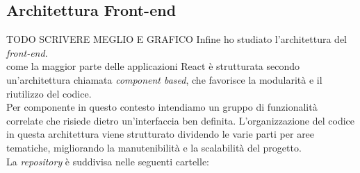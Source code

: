 \subsection{Architettura Front-end}
                                          TODO SCRIVERE MEGLIO E GRAFICO
Infine ho studiato l'architettura del \textit{front-end}.\\
{\movi} come la maggior parte delle applicazioni React è strutturata secondo un'architettura chiamata \textit{component 
based}, che favorisce la modularità e il riutilizzo del codice.\\
Per componente in questo contesto intendiamo un gruppo di funzionalità correlate che risiede dietro un'interfaccia ben definita.
L'organizzazione del codice in questa architettura viene strutturato dividendo le varie parti per aree tematiche, 
migliorando la manutenibilità e la scalabilità del progetto.\\
La \textit{repository} è suddivisa nelle seguenti cartelle:
